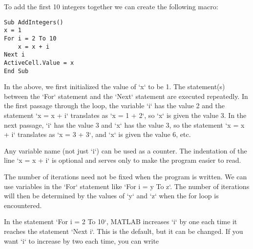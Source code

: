 To add the first 10 integers together we can create the following macro:
\small\begin{verbatim}
Sub AddIntegers()
x = 1
For i = 2 To 10
    x = x + i
Next i
ActiveCell.Value = x
End Sub
\end{verbatim}\normalsize
In the above, we first initialized the value of `x` to be 1. The
statement(s) between the `For` statement and the `Next` statement are
executed repeatedly. In the first passage through the loop, the variable
`i` has the value 2 and the statement `x = x + i` translates as
`x = 1 + 2`, so `x` is given the value 3. In the next passage, `i` has
the value 3 and `x` has the value 3, so the statement `x = x + i`
translates as `x = 3 + 3`, and `x` is given the value 6, etc.

Any variable name (not just `i`) can be used as a counter. The
indentation of the line `x = x + i` is optional and serves only to make
the program easier to read.

The number of iterations need not be fixed when the program is written.
We can use variables in the `For` statement like `For i = y To z`. The
number of iterations will then be determined by the values of `y` and
`z` when the for loop is encountered.

In the statement `For i = 2 To 10`, MATLAB increases `i` by one each
time it reaches the statement `Next i`. This is the default, but it can
be changed. If you want `i` to increase by two each time, you can write

